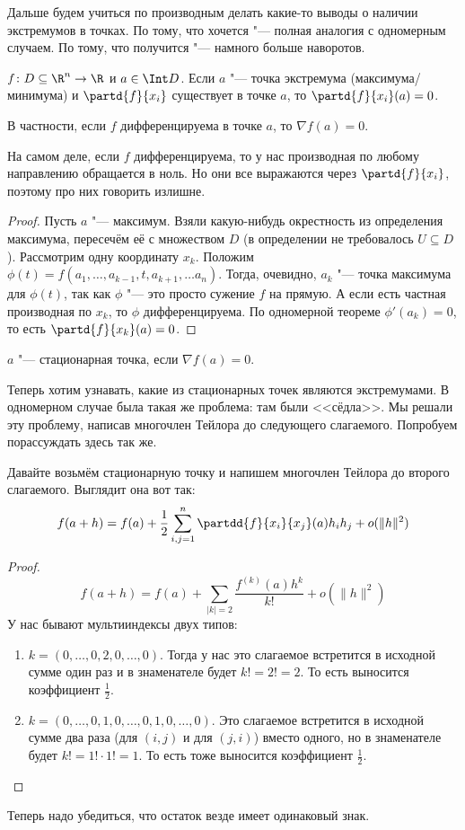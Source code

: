 Дальше будем учиться по производным делать какие-то выводы о наличии экстремумов в точках.
По тому, что хочется "--- полная аналогия с одномерным случаем.
По тому, что получится "--- намного больше наворотов.

\begin{theorem}
	$f \colon D \subseteq \R^n \to \R$ и $a \in \Int D$.
	Если $a$ "--- точка экстремума (максимума/минимума) и $\partd{f}{x_i}$ существует в точке $a$,
	то $\partd{f}{x_i}(a)=0$.
\end{theorem}
\begin{Rem}
	В частности, если $f$ дифференцируема в точке $a$, то $\nabla f(a) = 0$.
\end{Rem}
\begin{Rem}
	На самом деле, если $f$ дифференцируема, то у нас производная по
	любому направлению обращается в ноль.
	Но они все выражаются через $\partd{f}{x_i}$, поэтому про них говорить излишне.
\end{Rem}
\begin{proof}
	Пусть $a$ "--- максимум.
	Взяли какую-нибудь окрестность из определения максимума, пересечём её с множеством $D$
	(в определении не требовалось $U \subseteq D$).
	Рассмотрим одну координату $x_k$.
	Положим $\phi(t)=f(a_1, \dots, a_{k-1}, t, a_{k+1}, \dots a_n)$.
	Тогда, очевидно, $a_k$ "--- точка максимума для $\phi(t)$,
	так как $\phi$ "--- это просто сужение $f$ на прямую.
	А если есть частная производная по $x_k$, то $\phi$ дифференцируема.
	По одномерной теореме $\phi'(a_k)=0$, то есть $\partd{f}{x_k}(a)=0$.
\end{proof}

\begin{Def}
	$a$ "--- стационарная точка, если $\nabla f(a) = 0$.
\end{Def}

Теперь хотим узнавать, какие из стационарных точек являются экстремумами.
В одномерном случае была такая же проблема: там были <<сёдла>>.
Мы решали эту проблему, написав многочлен Тейлора до следующего слагаемого.
Попробуем порассуждать здесь так же.

Давайте возьмём стационарную точку и напишем многочлен Тейлора до второго слагаемого.
Выглядит она вот так:
\[
	f(a+h) = f(a) + \frac12 \sum_{i,j=1}^n \partdd{f}{x_i}{x_j} (a) h_i h_j + o(\|h\|^2)
\]
\begin{proof}
	\[ f(a+h) = f(a) + \sum_{|k|=2} \frac{f^{(k)}(a)h^k}{k!} + o(\|h\|^2)\]
	У нас бывают мультииндексы двух типов:
	\begin{enumerate}
	\item
		$k=(0, \dots, 0, 2, 0, \dots, 0)$.
		Тогда у нас это слагаемое встретится в исходной сумме один раз и в знаменателе будет $k!=2!=2$.
		То есть выносится коэффициент $\frac12$.
	\item
		$k=(0, \dots, 0, 1, 0, \dots, 0, 1, 0, \dots, 0)$.
		Это слагаемое встретится в исходной сумме два раза (для $(i, j)$ и для $(j, i)$)
		вместо одного, но в знаменателе будет $k!=1!\cdot1!=1$.
		То есть тоже выносится коэффициент $\frac12$.
	\end{enumerate}
\end{proof}
Теперь надо убедиться, что остаток везде имеет одинаковый знак.


